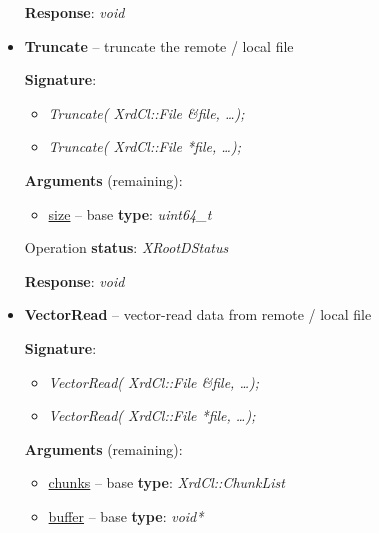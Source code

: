 \documentclass{article}
\begin{document}
\begin{itemize}
\begin{samepage}
                    \textbf{Response}: \textit{void}

                \end{samepage}

                \item \begin{samepage} \textbf{Truncate} -- truncate the remote / local file

                    \textbf{Signature}:
                    \begin{itemize} 
                        \item \textit{Truncate( XrdCl::File \&file, \ldots);}
                        \item \textit{Truncate( XrdCl::File *file, \ldots );}
                    \end{itemize}

                    \textbf{Arguments} (remaining):
                    \begin{itemize}
                        \item \underline{size} -- base \textbf{type}: \textit{uint64_t}
                    \end{itemize}

                    Operation \textbf{status}: \textit{XRootDStatus}

                    \textbf{Response}: \textit{void}
					
                \end{samepage}

                \item \begin{samepage} \textbf{VectorRead} -- vector-read data from remote / local file

                    \textbf{Signature}:
                    \begin{itemize} 
                        \item \textit{VectorRead( XrdCl::File \&file, \ldots);}
                        \item \textit{VectorRead( XrdCl::File *file, \ldots );}
                    \end{itemize}

                    \textbf{Arguments} (remaining):
                    \begin{itemize}
                        \item \underline{chunks} -- base \textbf{type}: \textit{XrdCl::ChunkList}
                        \item \underline{buffer} -- base \textbf{type}: \textit{void*}
                    \end{itemize}


\end{samepage}
\end{itemize}
\end{document}
